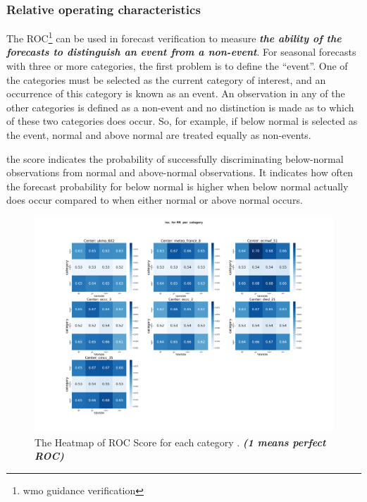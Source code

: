 \subsubsection{Relative operating characteristics}
The ROC\footnote{wmo guidance verification} can be used in forecast verification to measure \textbf{\textit{the ability of the forecasts to distinguish an event from a non-event}}. For seasonal forecasts with three or more categories, the first
problem is to define the “event”. One of the categories must be selected as the current category
of interest, and an occurrence of this category is known as an event. An observation in any of
the other categories is defined as a non-event and no distinction is made as to which of these
two categories does occur. So, for example, if below normal is selected as the event, normal
and above normal are treated equally as non-events.

the score indicates the probability of successfully
discriminating below-normal observations from normal and above-normal observations. It
indicates how often the forecast probability for below normal is higher when below normal
actually does occur compared to when either normal or above normal occurs.


\begin{figure}[H]
    \centering
    \includegraphics[scale=0.25]{plots/prob/roc/roc_RR_category.png}
    \caption{The Heatmap of ROC Score for each category  . \textbf{\textit{(1 means perfect ROC)}}}
\end{figure}


